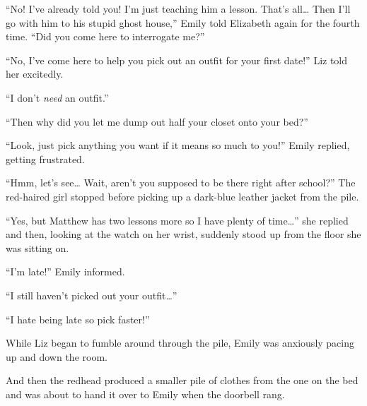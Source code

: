 “No! I've already told you! I'm just teaching him a lesson. That's all… Then I'll go with him to his stupid ghost house,” Emily told Elizabeth again for the fourth time. “Did you come here to interrogate me?”

“No, I've come here to help you pick out an outfit for your first date!” Liz told her excitedly.

“I don't \textit{need} an outfit.”

“Then why did you let me dump out half your closet onto your bed?”

“Look, just pick anything you want if it means so much to you!” Emily replied, getting frustrated.

“Hmm, let's see… Wait, aren't you supposed to be there right after school?” The red-haired girl stopped before picking up a dark-blue leather jacket from the pile.

“Yes, but Matthew has two lessons more so I have plenty of time…” she replied and then, looking at the watch on her wrist, suddenly stood up from the floor she was sitting on.

“I'm late!” Emily informed.

“I still haven't picked out your outfit…”

“I hate being late so pick faster!”

While Liz began to fumble around through the pile, Emily was anxiously pacing up and down the room.

And then the redhead produced a smaller pile of clothes from the one on the bed and was about to hand it over to Emily when the doorbell rang.